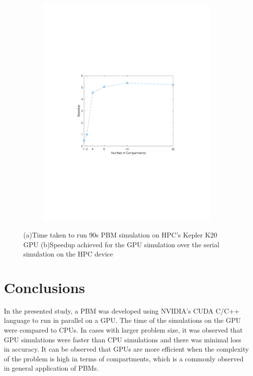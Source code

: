 \documentclass[preprint,10pt,authoryear,review]{elsarticle}
\begin{document}
\begin{figure}[H]
\begin{subfigure}[b]{0.48\linewidth}
         \includegraphics[scale=0.7,trim=120 240 120 240,width=\linewidth]{soe_gpuSpeedup.pdf}
         \caption{}
         \label{fig:res_serverSpeedup}
     \end{subfigure}
        \caption{(a)Time taken to run 90s PBM simulation on HPC's Kepler K20 GPU 
        (b)Speedup achieved for the GPU simulation over the serial simulation on the HPC device}
        \label{fig:res_server}
\end{figure}



\section{Conclusions}
\label{secConc}
In the presented study, a PBM was developed using NVIDIA's  CUDA C/C++ language 
to run in parallel on a GPU. The time of the simulations on the GPU were compared 
to CPUs. In cases with larger problem size, it was observed that GPU simulations 
were faster than CPU simulations and there was minimal loss in accuracy. 
It can be observed that GPUs are more efficient when the complexity of the 
problem is high in terms of compartments, which is a commonly observed in general 
application of PBMs.
\end{document}
